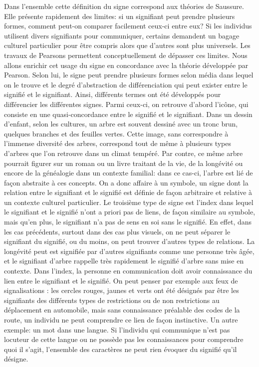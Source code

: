 Dans l'ensemble cette définition du signe correspond aux théories de Saussure.
Elle présente rapidement des limites: si un signifiant peut prendre plusieurs formes, comment peut-on comparer facilement ceux-ci entre eux? 
Si les individus utilisent divers signifiants pour communiquer, certains demandent un bagage culturel particulier pour être compris alors que d'autres sont plus universels.
Les travaux de Pearsons permettent conceptuellement de dépasser ces limites.
Nous allons enrichir cet usage du signe en concordance avec la théorie développée par Pearson. 
Selon lui, le signe peut prendre plusieurs formes selon média dans lequel on le trouve et le degré d'abstraction de différenciation qui peut exister entre le signifié et le signifiant. 
Ainsi, différents termes ont été développés pour différencier les différentes signes.
Parmi ceux-ci, on retrouve d'abord l'icône, qui consiste en une quasi-concordance entre le signifié et le signifiant. 
Dans un dessin d'enfant, selon les cultures, un arbre est souvent dessiné avec un tronc brun, quelques branches et des feuilles vertes. 
Cette image, sans correspondre à l'immense diversité des arbres, correspond tout de même à plusieurs types d'arbres que l'on retrouve dans un climat tempéré. 
Par contre, ce même arbre pourrait figurer sur un roman ou un livre traitant de la vie, de la longévité ou encore de la généalogie dans un contexte familial: dans ce cas-ci, l'arbre est lié de façon abstraite à ces concepts. 
On a donc affaire à un symbole, un signe dont la relation entre le signifiant et le signifié est définie de façon arbitraire et relative à un contexte culturel particulier. 
Le troisième type de signe est l'index dans lequel le signifiant et le signifié n'ont a priori pas de liens, de façon similaire au symbole, mais qu'en plus, le signifiant n'a pas de sens en soi sans le signifié. 
En effet, dans les cas précédents, surtout dans des cas plus visuels, on ne peut séparer le signifiant du signifié, ou du moins, on peut trouver d'autres types de relations. 
La longévité peut est signifiée par d'autres signifiants comme une personne très âgée, et le signifiant d'arbre rappelle très rapidement le signifié d'arbre sans mise en contexte. 
Dans l'index, la personne en communication doit avoir connaissance du lien entre le signifiant et le signifié. 
On peut penser par exemple aux feux de signalisations : les cercles rouges, jaunes et verts ont été désignés par être les signifiants des différents types de restrictions ou de non restrictions au déplacement en automobile, mais sans connaissance préalable des codes de la route, un individu ne peut comprendre ce lien de façon instinctive. 
Un autre exemple: un mot dans une langue. 
Si l'individu qui communique n'est pas locuteur de cette langue ou ne possède pas les connaissances pour comprendre quoi il s'agit, l'ensemble des caractères ne peut rien évoquer du signifié qu'il désigne.

